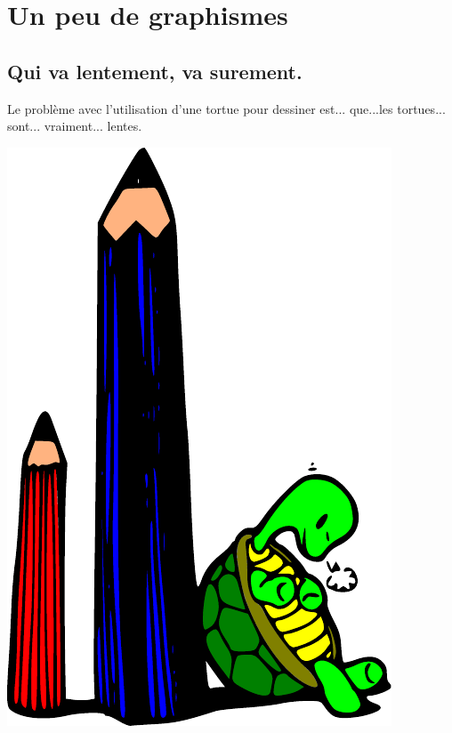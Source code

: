 


\chapter{Un peu de graphismes}
\section{Qui va lentement, va surement.}
Le problème avec l'utilisation d'une tortue pour dessiner est... que...\hspace{0.5cm}les tortues...\hspace{1cm}\\
sont...\hspace{2cm} vraiment... \hspace{4cm} lentes.


\begin{center}
\includegraphics[scale=1]{images/tortue}
\end{center}

